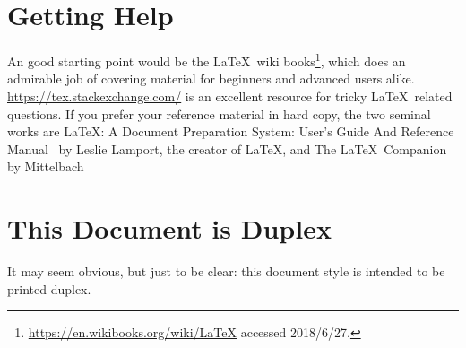 \section*{Getting Help}
\label{sec:getting-help}

An good starting point would be the \LaTeX\ wiki
books\footnote{\url{https://en.wikibooks.org/wiki/LaTeX} accessed 2018/6/27.}, which does
an admirable job of covering material for beginners and advanced users
alike.  \url{https://tex.stackexchange.com/} is an excellent resource
for tricky \LaTeX\ related questions. If you prefer your reference
material in hard copy, the two seminal works are \LaTeX: A Document
Preparation System: User's Guide And Reference
Manual~\cite{Lamport1994:LADPSUGARM1994} by Leslie Lamport, the creator of \LaTeX,
and The \LaTeX\ Companion~\cite{Mittelbach2004:TLC2004}
by Mittelbach \etal

\section*{This Document is Duplex}
\label{sec:print-this-docum}

It may seem obvious, but just to be clear: this document style is intended to be printed duplex.


